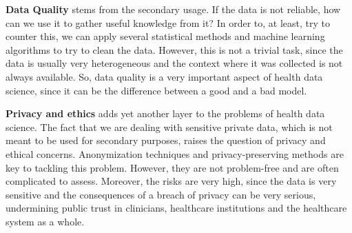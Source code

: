 \textbf{Data Quality} stems from the secondary usage. If the data is not reliable, how can we use it to gather useful knowledge from it? In order to, at least, try to counter this, we can apply several statistical methods and machine learning algorithms to try to clean the data. However, this is not a trivial task, since the data is usually very heterogeneous and the context where it was collected is not always available. So, data quality is a very important aspect of health data science, since it can be the difference between a good and a bad model.



\textbf{Privacy and ethics} adds yet another layer to the problems of health data science. The fact that we are dealing with sensitive private data, which is not meant to be used for secondary purposes, raises the question of privacy and ethical concerns. Anonymization techniques and privacy-preserving methods are key to tackling this problem. However, they are not problem-free and are often complicated to assess. Moreover, the risks are very high, since the data is very sensitive and the consequences of a breach of privacy can be very serious, undermining public trust in clinicians, healthcare institutions and the healthcare system as a whole.


